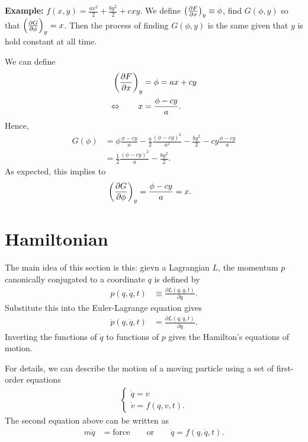 \textbf{Example: } $f(x,y)=\frac{ax^{2}}{2}+\frac{by^{2}}{2}+cxy$. We define $ \left( \frac{\partial {F}}{\partial x} \right)_y \equiv \phi $, find $ G(\phi,y) $ so that $ \left( \frac{\partial {G}}{\partial {\phi}} \right)_y =x $.
Then the process of finding $G(\phi,y)$ is the same given that $y$
is hold constant at all time.

We can define
\begin{align}
\left( \frac{\partial {F}}{\partial x} \right)_y &= \phi = ax+cy\\
\Leftrightarrow\qquad x &= \frac{\phi-cy}{a}.
\end{align}
Hence, 
\begin{align}
G(\phi) &= \phi \frac{\phi-cy}{a} -\frac{a}{2} \frac{(\phi-cy)^2}{a^2} - \frac{by^2}{2} -cy\frac{\phi-cy}{a}\\
&= \frac{1}{2} \frac{(\phi-cy)^2}{a} -\frac{by^2}{2}.
\end{align}
As expected, this implies to
\begin{align}
\left( \frac{\partial {G}}{\partial {\phi}} \right)_y &= \frac{\phi-cy}{a}=x. 
\end{align}

\section{Hamiltonian}

The main idea of this section is this: gievn a Lagrangian $L$, the momentum $p$ canonically conjugated
to a coordinate $q$ is defined by
\begin{align}
p\left(q,\dot{q},t\right) & \equiv\frac{\partial L\left(q,\dot{q},t\right)}{\partial\dot{q}}.
\end{align}
Substitute this into the Euler-Lagrange equation gives
\begin{align}
\dot{p}\left(q,\dot{q},t\right) & =\frac{\partial L\left(q,\dot{q},t\right)}{\partial q}.
\end{align}
Inverting the functions of $\dot{q}$ to functions of $p$ gives the
Hamilton's equations of motion.

For details, we can describe the motion of a moving particle using a set of first-order equations
\begin{align}
\left\{ \begin{array}{l}
\dot{q} =v\\
\dot{v} = f(q,v,t).
\end{array}\right.
\end{align}
The second equation above can be written as 
\begin{align}
m\ddot{q} &= \mathrm{force}\qquad \mathrm{or}\qquad \ddot{q}= f(q,\dot{q},t).
\end{align}

